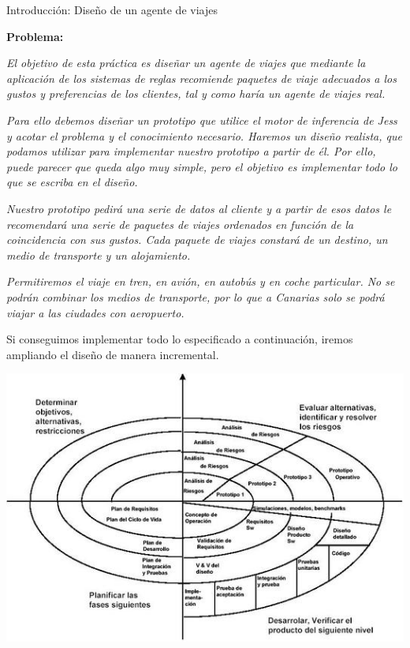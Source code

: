 \documentclass[11pt, a4paper, spanish, openright, twoside]{book}
\begin{document}
\begin{section}{Introducción: Diseño de un agente de viajes}

	\textbf{Problema:} 
	
	\textit{El objetivo de esta práctica es diseñar un agente de viajes que mediante la aplicación de los sistemas de reglas recomiende paquetes de viaje adecuados a los gustos y preferencias de los 
			clientes, tal y como haría un agente de viajes real.}
	
	\textit{Para ello debemos diseñar un prototipo que utilice el motor de inferencia de Jess y acotar el problema y el conocimiento necesario. Haremos un diseño realista, que podamos utilizar para implementar nuestro prototipo a partir de él. Por ello, 
		puede parecer que queda algo muy simple, pero el objetivo es implementar todo lo que se escriba en el diseño.}
	
	\textit{Nuestro prototipo pedirá una serie de datos al cliente y a partir de esos datos le recomendará una serie de paquetes de viajes ordenados en función de la coincidencia con sus gustos. Cada paquete 
		de viajes constará de un destino, un medio de transporte y un alojamiento.}

	
	\textit{Permitiremos el viaje en tren,  en avión, en autobús y en coche particular. No se podrán combinar los medios de transporte, por lo que a Canarias solo se podrá viajar a las ciudades con aeropuerto.}
	
	Si conseguimos implementar todo lo especificado a continuación, iremos ampliando el diseño de manera incremental.
	
	\begin{center}
	\includegraphics{espiral}
	\end{center}
	
\end{section}
\end{document}
